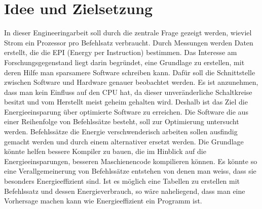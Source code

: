 \chapter{Idee und Zielsetzung}



In dieser Engineeringarbeit soll durch die zentrale Frage gezeigt werden, wieviel Strom ein Prozessor pro Befehlsatz verbraucht. Durch Messungen werden Daten erstellt, die die EPI (Energy per Instruction) bestimmen. Das Interesse am Forschungsgegenstand liegt darin begründet, eine Grundlage zu erstellen, mit deren Hilfe man sparsamere Software schreiben kann. Dafür soll die Schnittstelle zwischen Software und Hardware genauer beobachtet werden. Es ist anzunehmen, dass man kein Einfluss auf den CPU hat, da dieser unveränderliche Schaltkreise besitzt und vom Herstellt meist geheim gehalten wird. Deshalb ist das Ziel die Energieeinsparung über optimierte Software zu erreichen. Die Software die aus einer Reihenfolge von Befehlssätze besteht, soll zur Optimierung untersucht werden. Befehlssätze die Energie verschwenderisch arbeiten sollen ausfindig gemacht werden und durch einem alternativer ersetzt werden. Die Grundlage könnte helfen bessere Kompiler zu bauen, die im Hinblick auf die Energieeinsparungen, besseren Maschienencode kompilieren können. Es könnte so eine Verallgemeinerung von Befehlssätze entstehen von denen man weiss, dass sie besonders Energieeffizient sind. Ist es möglich eine Tabellen zu erstellen mit Befehlssatz und dessen Energieverbrauch, so wäre naheliegend, dass man eine Vorhersage machen kann wie Energieeffizient ein Programm ist.  
\par
